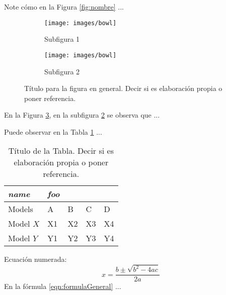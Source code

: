 \documentclass[fleqn]{Paquetes/RevDigMatEduInt}
\begin{document}
Note cómo en la Figura \ref{fig:nombre} ...

\begin{figure}[ht!!!]
	\centering
	\begin{minipage}{0.7\textwidth}
		\centering
		\begin{subfigure}{0.47\textwidth}
			\centering
			\texttt{[image: images/bowl]}
			\caption{Subfigura 1}
			\label{subfig:1}
		\end{subfigure}
		\begin{subfigure}{0.47\textwidth}
			\centering
			\texttt{[image: images/bowl]}
			\caption{Subfigura 2}
			\label{subfig:2}
		\end{subfigure}
		\caption{ Título para la figura en general. Decir si es elaboración propia o poner referencia.}
		\label{fig:2}
	\end{minipage}
\end{figure}

En la Figura \ref{fig:2}, en la subfigura \ref{subfig:2} se observa que ...


Puede observar en la Tabla \ref{tabla:nombre} ...

\begin{table}[ht!!!]
	\centering
	\begin{minipage}{0.7\textwidth}
	\caption{Título de la Tabla. Decir si es elaboración propia o poner referencia.}
	\centering
	\begin{tabular}{*5l}    \toprule
		\emph{name} & \emph{foo} & & &  \\ \midrule
		Models    & A  & B  & C  & D  \\ 
		Model $X$ & X1 & X2 & X3 & X4\\ 
		Model $Y$ & Y1 & Y2 & Y3 & Y4\\ \bottomrule
	\end{tabular}
	\label{tabla:nombre}
	\end{minipage}
\end{table}


Ecuación numerada:
\begin{equation}
	x=\frac{b\pm \sqrt{b^2-4ac}}{2a}
	\label{eqn:formulaGeneral}
\end{equation}
En la fórmula \ref{eqn:formulaGeneral} ...
\end{document}
